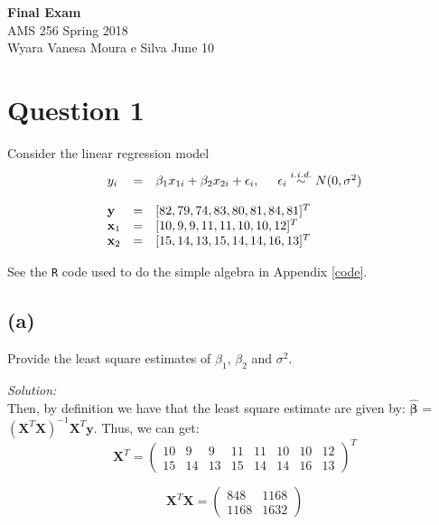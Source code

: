 \documentclass[a4paper, 11pt]{article}
\begin{document}
\noindent
{\Large\textbf{Final Exam} \hfill \\
AMS 256 \hfill Spring 2018 \\
Wyara Vanesa Moura e Silva \hfill June 10\\}

\section*{Question 1}

Consider the linear regression model
\begin{equation*}
\begin{array}{lclllll}
y_i & = &  \beta_1x_{1i} + \beta_2x_{2i} + \epsilon_i, \hspace{0.5cm}  \epsilon_i \stackrel{i.i.d.}{\sim} N(0,\sigma^2) \\ \\ 

\textbf{y} & = &  [82, 79, 74, 83, 80, 81, 84, 81]^T\\
\textbf{x}_1 & = & [10, 9, 9, 11, 11, 10, 10, 12]^T \\
\textbf{x}_2 & = & [15, 14, 13, 15, 14, 14, 16, 13]^T \\
\end{array}
\end{equation*}

See the \texttt{R} code used to do the simple algebra in Appendix \ref{code}.
\subsection*{(a)} Provide the least square estimates of $\beta_1$, $\beta_2$ and $\sigma^2$.

\noindent
\textit{Solution:}\\

Then, by definition we have that the least square estimate are given by: $\hat{\boldsymbol{\beta}}$ = $(\textbf{X}^T\textbf{X})^{-1}\textbf{X}^T\textbf{y}$. Thus, we can get:
\begin{equation*}
\textbf{X}^T = 
\begin{pmatrix} 10 & 9 & 9 & 11 & 11 &10 & 10 & 12 \\ 15 & 14 & 13 & 15 & 14 & 14 & 16 & 13 \end{pmatrix}^T 
\end{equation*}

\begin{equation*}
\textbf{X}^T \textbf{X} = 
\begin{pmatrix} 848 & 1168 \\ 1168 & 1632 \end{pmatrix}
\end{equation*}
\end{document}
